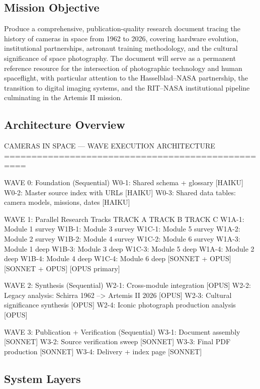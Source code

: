 \documentclass[11pt,letterpaper]{article}
\begin{document}
\subsection{Mission Objective}

Produce a comprehensive, publication-quality research document tracing the history of cameras in space from 1962 to 2026, covering hardware evolution, institutional partnerships, astronaut training methodology, and the cultural significance of space photography. The document will serve as a permanent reference resource for the intersection of photographic technology and human spaceflight, with particular attention to the Hasselblad--NASA partnership, the transition to digital imaging systems, and the RIT--NASA institutional pipeline culminating in the Artemis II mission.

\subsection{Architecture Overview}

\begin{asciibox}
CAMERAS IN SPACE --- WAVE EXECUTION ARCHITECTURE
==================================================

WAVE 0: Foundation (Sequential)
  W0-1: Shared schema + glossary [HAIKU]
  W0-2: Master source index with URLs [HAIKU]
  W0-3: Shared data tables: camera models, missions, dates [HAIKU]

WAVE 1: Parallel Research Tracks
  TRACK A                  TRACK B                  TRACK C
  W1A-1: Module 1 survey   W1B-1: Module 3 survey   W1C-1: Module 5 survey
  W1A-2: Module 2 survey   W1B-2: Module 4 survey   W1C-2: Module 6 survey
  W1A-3: Module 1 deep     W1B-3: Module 3 deep     W1C-3: Module 5 deep
  W1A-4: Module 2 deep     W1B-4: Module 4 deep     W1C-4: Module 6 deep
  [SONNET + OPUS]          [SONNET + OPUS]          [OPUS primary]

WAVE 2: Synthesis (Sequential)
  W2-1: Cross-module integration [OPUS]
  W2-2: Legacy analysis: Schirra 1962 --> Artemis II 2026 [OPUS]
  W2-3: Cultural significance synthesis [OPUS]
  W2-4: Iconic photograph production analysis [OPUS]

WAVE 3: Publication + Verification (Sequential)
  W3-1: Document assembly [SONNET]
  W3-2: Source verification sweep [SONNET]
  W3-3: Final PDF production [SONNET]
  W3-4: Delivery + index page [SONNET]
\end{asciibox}

\subsection{System Layers}
\end{document}
